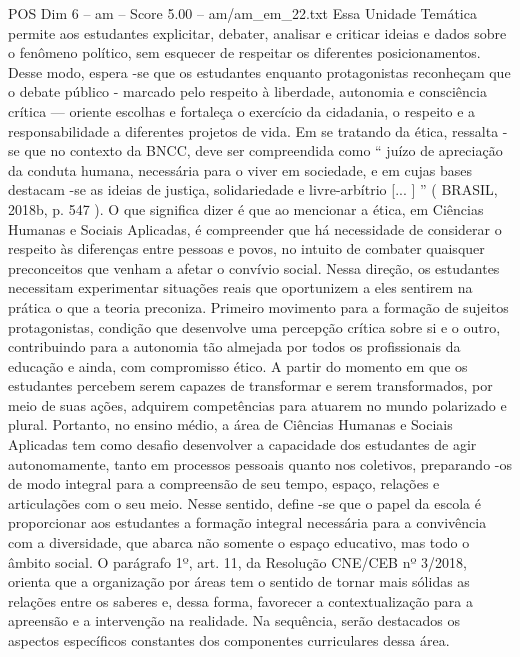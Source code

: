 \begin{textsample}{POS Dim 6 – am – Score 5.00 – am/am\_em\_22.txt}
Essa Unidade Temática permite aos estudantes explicitar, debater, analisar e criticar ideias e dados sobre o fenômeno político, sem esquecer de respeitar os diferentes posicionamentos.
Desse modo, espera -se que os estudantes enquanto protagonistas reconheçam que o debate público - marcado pelo respeito à liberdade, autonomia e consciência crítica — oriente escolhas e fortaleça o exercício da cidadania, o respeito e a responsabilidade a diferentes projetos de vida.
Em se tratando da ética, ressalta -se que no contexto da BNCC, deve ser compreendida como “ juízo de apreciação da conduta humana, necessária para o viver em sociedade, e em cujas bases destacam -se as ideias de justiça, solidariedade e livre-arbítrio [... ] ” ( BRASIL, 2018b, p. 547 ).
O que significa dizer é que ao mencionar a ética, em Ciências Humanas e Sociais Aplicadas, é compreender que há necessidade de considerar o respeito às diferenças entre pessoas e povos, no intuito de combater quaisquer preconceitos que venham a afetar o convívio social.
Nessa direção, os estudantes necessitam experimentar situações reais que oportunizem a eles sentirem na prática o que a teoria preconiza.
Primeiro movimento para a formação de sujeitos protagonistas, condição que desenvolve uma percepção crítica sobre si e o outro, contribuindo para a autonomia tão almejada por todos os profissionais da educação e ainda, com compromisso ético.
A partir do momento em que os estudantes percebem serem capazes de transformar e serem transformados, por meio de suas ações, adquirem competências para atuarem no mundo polarizado e plural.
Portanto, no ensino médio, a área de Ciências Humanas e Sociais Aplicadas tem como desafio desenvolver a capacidade dos estudantes de agir autonomamente, tanto em processos pessoais quanto nos coletivos, preparando -os de modo integral para a compreensão de seu tempo, espaço, relações e articulações com o seu meio.
Nesse sentido, define -se que o papel da escola é proporcionar aos estudantes a formação integral necessária para a convivência com a diversidade, que abarca não somente o espaço educativo, mas todo o âmbito social.
O parágrafo 1º, art. 11, da Resolução CNE/CEB nº 3/2018, orienta que a organização por áreas tem o sentido de tornar mais sólidas as relações entre os saberes e, dessa forma, favorecer a contextualização para a apreensão e a intervenção na realidade.
Na sequência, serão destacados os aspectos específicos constantes dos componentes curriculares dessa área.

\end{textsample}
